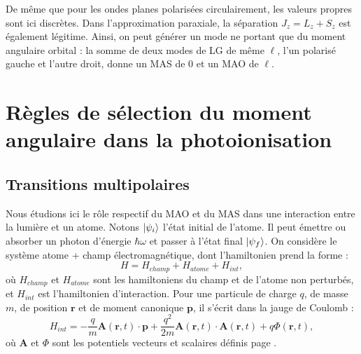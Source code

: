 De même que pour les ondes planes polarisées circulairement, les valeurs propres sont ici discrètes. Dans l'approximation paraxiale, la séparation $J_z=L_z+S_z$ est également légitime. Ainsi, on peut générer un mode ne portant que du moment angulaire orbital : la somme de deux modes de LG de même $\ell$, l'un polarisé gauche et l'autre droit, donne un MAS de 0 et un MAO de $\ell$.  


\chapter{Règles de sélection du moment angulaire dans la photoionisation}
\label{sec:selectionrules}

\section{Transitions multipolaires}
\label{sec:multipolar}
Nous étudions ici le rôle respectif du MAO et du MAS dans une interaction entre la lumière et un atome. Notons $\ket{\psi_i}$ l'état initial de l'atome. Il peut émettre ou absorber un photon d'énergie $\hbar\omega$ et passer à l'état final $\ket{\psi_f}$. On considère le système {atome + champ électromagnétique}, dont l'hamiltonien prend la forme :
\[ H = H_{champ} + H_{atome} + H_{int},\]
où $H_{champ}$ et $H_{atome}$ sont les hamiltoniens du champ et de l'atome non perturbés, et $H_{int}$ est l'hamiltonien d'interaction. Pour une particule de charge $q$, de masse $m$, de position $\bm{r}$ et de moment canonique $\bm{p}$, il s'écrit dans la jauge de Coulomb :
\begin{equation}
H_{int} = -\frac{q}{m}\bm{A}(\bm{r},t)\cdot\bm{p}+\frac{q^2}{2m}\bm{A}(\bm{r},t)\cdot\bm{A}(\bm{r},t)+q\Phi(\bm{r},t),
\label{eq:hint}
\end{equation}
où $\bm{A}$ et $\Phi$ sont les potentiels vecteurs et scalaires définis page \pageref{eq:para10}.

